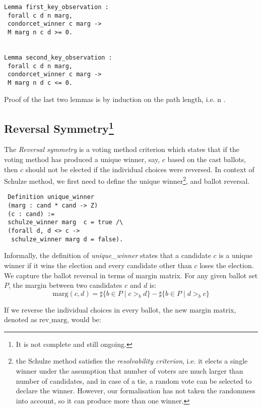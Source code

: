 \documentclass[compsoc,conference,a4paper,10pt,times]{IEEEtran}
\begin{document}
 \begin{verbatim}
Lemma first_key_observation : 
 forall c d n marg, 
 condorcet_winner c marg -> 
 M marg n c d >= 0.


Lemma second_key_observation : 
 forall c d n marg, 
 condorcet_winner c marg -> 
 M marg n d c <= 0.

 \end{verbatim}

Proof of the last two lemmas is by induction on the path length, i.e. n \cite{Carre:1971:ANR}. 







\subsection{Reversal Symmetry\footnote{It is not complete and still ongoing.}}
 The \textit{Reversal symmetry} is a voting method criterion which states that if the
 voting method has produced a unique 
  winner, say, $c$ based on the cast ballots, then $c$ should not be elected if the 
 individual choices were reversed. 
 In context of Schulze method, we first need to define the unique winner\footnote{
 the Schulze method satisfies the 
 \textit{resolvability criterion}, i.e. it elects a single winner under the 
 assumption that number of voters are much larger than
 number of candidates, and in case of a tie,
 a random vote can be selected to declare the winner.  However, our 
 formalisation has not taken the randomness into account, so it can 
 produce more than one winner.}, and ballot reversal. 
 
 \begin{verbatim}
 Definition unique_winner 
 (marg : cand * cand -> Z) 
 (c : cand) :=
 schulze_winner marg  c = true /\
 (forall d, d <> c -> 
  schulze_winner marg d = false).
\end{verbatim}  
\noindent
Informally, the definition of \textit{unique\_winner} states that a 
candidate $c$ is a unique winner
if it wins the election and every candidate 
other than $c$ loses the election.
We capture the ballot reversal in terms of margin matrix. For any given ballot set $P$, 
the margin between two candidates $c$ and $d$ is: 
\[
  \mathrm{marg}(c, d) = \sharp \lbrace b \in P \mid c >_b d \rbrace -
            \sharp \lbrace b \in P \mid d >_b c \rbrace
\] 

\noindent
If we reverse the individual choices in every ballot, the new margin matrix, denoted as $\mathrm{rev\_marg}$, would be:
\end{document}
